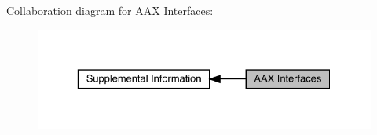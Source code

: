 \begin{DoxyRefList}
\item[Class \mbox{\hyperlink{a01857}{A\+A\+X\+\_\+\+I\+Parameter}} ]\label{a00844__aax_sdk_internal000002}%
%
 
\item[Class \mbox{\hyperlink{a01853}{A\+A\+X\+\_\+\+I\+Parameter\+Value}} ]\label{a00844__aax_sdk_internal000001}%
%
 
\item[Class \mbox{\hyperlink{a01877}{A\+A\+X\+\_\+\+I\+Taper\+Delegate\+Base}} ]\label{a00844__aax_sdk_internal000003}%
%

\end{DoxyRefList}Collaboration diagram for A\+AX Interfaces\+:
\nopagebreak
\begin{figure}[H]
\begin{center}
\leavevmode
\includegraphics[width=329pt]{a00844}
\end{center}
\end{figure}
